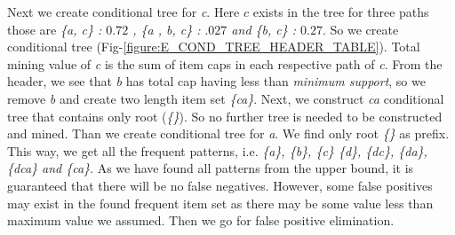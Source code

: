\documentclass[conference]{IEEEtran}
\begin{document}
Next we create conditional tree for \emph{c}. Here $c$ exists in the tree for three paths those are \emph{\{a, c\} : $0.72$ , \{a , b, c\} : $.027$ and \{b, c\} : $0.27$}. So we create conditional tree (Fig-\ref{figure:E_COND_TREE_HEADER_TABLE}). Total mining value of \emph{c} is the sum of item caps in each respective path of \emph{c}. From the header, we see that \emph{b} has total cap having less than \emph{minimum support}, so we remove \emph{b} and create two length item set \emph{\{ca\}}. Next, we construct \emph{ca} conditional tree that contains only root (\emph{\{\}}). So no further tree is needed to be constructed and mined. Than we create conditional tree for \emph{a}. We find only root \emph{\{\}} as prefix. This way, we get all the frequent patterns, i.e. \emph{\{a\}, \{b\}, \{c\} \{d\}, \{dc\}, \{da\}, \{dca\} and \{ca\}}. As we have found all patterns from the upper bound, it is guaranteed that there will be no false negatives. However, some false positives may exist in the found frequent item set as there may be some value less than maximum value we assumed. Then we go for false positive elimination.
\end{document}
